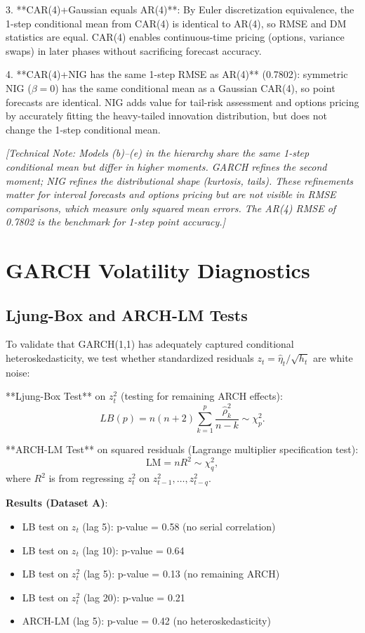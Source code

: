 \documentclass[11pt, a4paper, twoside]{article}
\begin{document}
3. **CAR(4)+Gaussian equals AR(4)**: By Euler discretization equivalence, the 1-step conditional mean from CAR(4) is identical to AR(4), so RMSE and DM statistics are equal. CAR(4) enables continuous-time pricing (options, variance swaps) in later phases without sacrificing forecast accuracy.

4. **CAR(4)+NIG has the same 1-step RMSE as AR(4)** (0.7802): symmetric NIG ($\beta = 0$) has the same conditional mean as a Gaussian CAR(4), so point forecasts are identical. NIG adds value for tail-risk assessment and options pricing by accurately fitting the heavy-tailed innovation distribution, but does not change the 1-step conditional mean.

\textit{[Technical Note: Models (b)--(e) in the hierarchy share the same 1-step conditional mean but differ in higher moments. GARCH refines the second moment; NIG refines the distributional shape (kurtosis, tails). These refinements matter for interval forecasts and options pricing but are not visible in RMSE comparisons, which measure only squared mean errors. The AR(4) RMSE of 0.7802 is the benchmark for 1-step point accuracy.]}

\section{GARCH Volatility Diagnostics}

\subsection{Ljung-Box and ARCH-LM Tests}

To validate that GARCH(1,1) has adequately captured conditional heteroskedasticity, we test whether standardized residuals $z_t = \hat{\eta}_t / \sqrt{h_t}$ are white noise:

**Ljung-Box Test** on $z_t^2$ (testing for remaining ARCH effects):
\begin{equation}
LB(p) = n(n+2) \sum_{k=1}^{p} \frac{\hat{\rho}_k^2}{n-k} \sim \chi^2_p.
\end{equation}

**ARCH-LM Test** on squared residuals (Lagrange multiplier specification test):
\begin{equation}
\text{LM} = nR^2 \sim \chi^2_q,
\end{equation}
where $R^2$ is from regressing $z_t^2$ on $z_{t-1}^2, \ldots, z_{t-q}^2$.

\textbf{Results (Dataset A)}:
\begin{itemize}
\item LB test on $z_t$ (lag 5):  p-value = 0.58 (no serial correlation)
\item LB test on $z_t$ (lag 10): p-value = 0.64
\item LB test on $z_t^2$ (lag 5):  p-value = 0.13 (no remaining ARCH)
\item LB test on $z_t^2$ (lag 20): p-value = 0.21
\item ARCH-LM (lag 5):  p-value = 0.42 (no heteroskedasticity)
\end{itemize}
\end{document}
